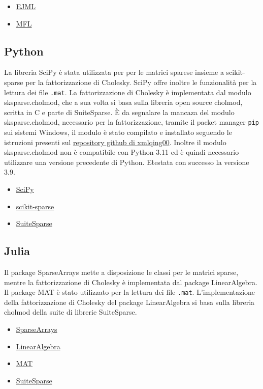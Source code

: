 \documentclass[a4paper, 12pt]{article}
\begin{document}
\begin{itemize}
\item \href{http://ejml.org/}{EJML}
\item \href{https://github.com/HebiRobotics/MFL}{MFL}
\end{itemize}

\subsection{Python}
La libreria SciPy è stata utilizzata per per le matrici sparese insieme a
scikit-sparse per la fattorizzazione di Cholesky.
SciPy offre inoltre le funzionalità per la lettura dei file \texttt{.mat}.
La fattorizzazione di Cholesky è implementata dal modulo sksparse.cholmod,
che a sua volta si basa sulla libreria open source cholmod, scritta in C e
parte di SuiteSparse.
\`E da segnalare la mancaza del modulo sksparse.cholmod, necessario per la
fattorizzazione, tramite il packet manager \texttt{pip} sui sistemi Windows,
il modulo è stato compilato e installato seguendo le istruzioni presenti sul
\href{https://github.com/xmlyqing00/Cholmod-Scikit-Sparse-Windows}
{repository github di xmlqing00}.
Inoltre il modulo sksparse.cholmod non è compatibile con Python 3.11
ed è quindi necessario utilizzare una versione precedente di Python.
E\` testata con successo la versione 3.9.

\begin{itemize}
\item \href{https://www.scipy.org/}{SciPy}
\item \href{https://github.com/scikit-sparse/scikit-sparse} {scikit-sparse}
\item \href{http://suitesparse.com}{SuiteSparse}
\end{itemize}

\subsection{Julia}
Il package SparseArrays mette a disposizione le classi per le matrici sparse,
mentre la fattorizzazione di Cholesky è implementata dal package LinearAlgebra.
Il package MAT è stato utilizzato per la lettura dei file \texttt{.mat}.
L'implementazione della fattorizzazione di Cholesky del package LinearAlgebra
si basa sulla libreria cholmod della suite di librerie SuiteSparse.

\begin{itemize}
\item \href{https://docs.julialang.org/en/v1/stdlib/SparseArrays/}{SparseArrays}
\item \href{https://docs.julialang.org/en/v1/stdlib/LinearAlgebra/}
{LinearAlgebra}
\item \href{https://github.com/JuliaIO/MAT.jl}{MAT}
\item \href{http://suitesparse.com}{SuiteSparse}
\end{itemize}
\end{document}
